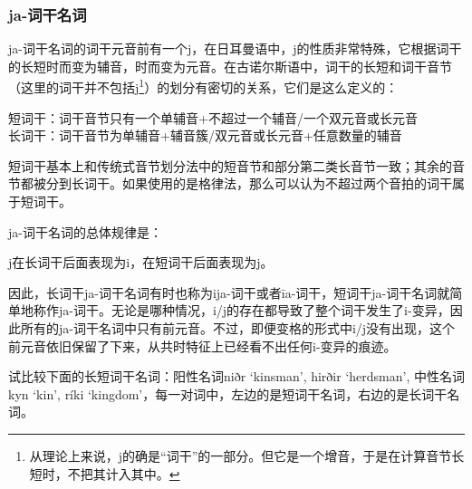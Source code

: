 \subsubsection{ja-词干名词}\label{ja-词干名词}

ja-词干名词的词干元音前有一个j，在日耳曼语中，j的性质非常特殊，它根据词干的长短时而变为辅音，时而变为元音。在古诺尔斯语中，词干的长短和词干音节（这里的词干并不包括j\footnote{从理论上来说，j的确是``词干''的一部分。但它是一个增音，于是在计算音节长短时，不把其计入其中。}）的划分有密切的关系，它们是这么定义的：

\begin{info}
  短词干：词干音节只有一个单辅音+不超过一个辅音/一个双元音或长元音\\
  长词干：词干音节为单辅音+辅音簇/双元音或长元音+任意数量的辅音
\end{info}

短词干基本上和传统式音节划分法中的短音节和部分第二类长音节一致；其余的音节都被分到长词干。如果使用的是格律法，那么可以认为不超过两个音拍的词干属于短词干。

ja-词干名词的总体规律是：

\begin{info}
  j在长词干后面表现为i，在短词干后面表现为j。
\end{info}

因此，长词干ja-词干名词有时也称为ija-词干或者īa-词干，短词干ja-词干名词就简单地称作ja-词干。无论是哪种情况，i/j的存在都导致了整个词干发生了i-变异，因此所有的ja-词干名词中只有前元音。不过，即便变格的形式中i/j没有出现，这个前元音依旧保留了下来，从共时特征上已经看不出任何i-变异的痕迹。

试比较下面的长短词干名词：阳性名词niðr `kinsman', hirðir `herdsman',
中性名词kyn `kin', ríki
`kingdom'，每一对词中，左边的是短词干名词，右边的是长词干名词。

